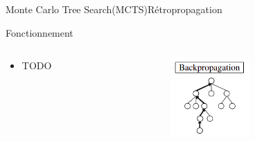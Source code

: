 \begin{frame}{Monte Carlo Tree Search(MCTS)}{Rétropropagation}
	\begin{block}{Fonctionnement}
		\begin{columns}
			\begin{column}{6cm}
				\begin{itemize}
					\item TODO
				\end{itemize}
			\end{column}
			\begin{column}{3cm}
				\includegraphics[width=3cm]{ressources/Backpropagation.png}
			\end{column}
		\end{columns}
	\end{block}
\end{frame}